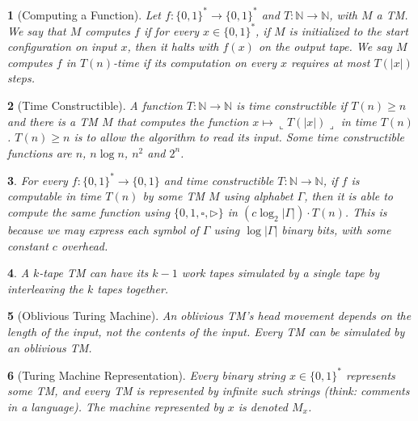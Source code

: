\documentclass[10pt]{article}
\newtheorem{note}{}[section]
\begin{document}
\begin{note}[Computing a Function]
  Let $f : \{0, 1\}^\ast \to \{0, 1\}^\ast$ and
  $T : \mathbb{N} \to \mathbb{N}$, with $M$ a TM.
  We say that $M$ computes $f$ if for every $x \in \{0, 1\}^\ast$, if
  $M$ is initialized to the start configuration on input $x$, then it halts
  with $f(x)$ on the output tape.
  We say $M$ computes $f$ in $T(n)$-time if its computation on every
  $x$ requires at most $T(|x|)$ steps.
\end{note}

\begin{note}[Time Constructible]
  A function $T: \mathbb{N} \to \mathbb{N}$ is time constructible if
  $T(n) \geq n$ and there is a TM $M$ that computes the function
  $x \mapsto \llcorner T(|x|) \lrcorner$ in time $T(n)$.
  $T(n) \geq n$ is to allow the algorithm to read its input.
  Some time constructible functions are $n$, $n \log n$, $n^2$ and $2^n$.
\end{note}

\begin{note}
  For every $f : \{0, 1\}^\ast \to \{0, 1\}$ and time constructible
  $T : \mathbb{N} \to \mathbb{N}$, if $f$ is computable in time $T(n)$ by
  some TM $M$ using alphabet $\Gamma$, then it is able to compute the same
  function using $\{0, 1, \square, \triangleright\}$ in 
  $\left(c \log_2 | \Gamma| \right) \cdot T(n)$.
  This is because we may express each symbol of $\Gamma$ using
  $\log |\Gamma|$ binary bits, with some constant $c$ overhead.
\end{note}

\begin{note}
  A $k$-tape TM can have its $k - 1$ work tapes simulated by a single tape by
  interleaving the $k$ tapes together.
\end{note}

\begin{note}[Oblivious Turing Machine]
  An oblivious TM's head movement depends on the length of the input, not
  the contents of the input.
  Every TM can be simulated by an oblivious TM.
\end{note}

\begin{note}[Turing Machine Representation]
  Every binary string $x \in \{0, 1\}^\ast$ represents some TM, and every TM
  is represented by infinite such strings (think: comments in a language).
  The machine represented by $x$ is denoted $M_x$.
\end{note}
\end{document}
